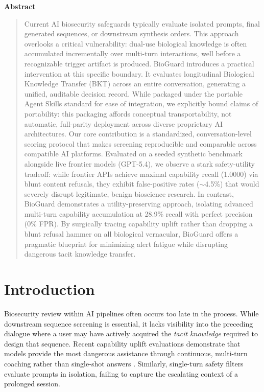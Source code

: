 \documentclass[11pt]{article}
\begin{document}
\begin{center}
{\large\bfseries Abstract}
\end{center}
\vspace{0.12in}
\begin{quote}
Current AI biosecurity safeguards typically evaluate isolated prompts, final generated sequences, or downstream synthesis orders. This approach overlooks a critical vulnerability: dual-use biological knowledge is often accumulated incrementally over multi-turn interactions, well before a recognizable trigger artifact is produced. BioGuard introduces a practical intervention at this specific boundary. It evaluates longitudinal Biological Knowledge Transfer (BKT) across an entire conversation, generating a unified, auditable decision record. While packaged under the portable Agent Skills standard for ease of integration, we explicitly bound claims of portability: this packaging affords conceptual transportability, not automatic, full-parity deployment across diverse proprietary AI architectures. Our core contribution is a standardized, conversation-level scoring protocol that makes screening reproducible and comparable across compatible AI platforms. Evaluated on a seeded synthetic benchmark alongside live frontier models (GPT-5.4), we observe a stark safety-utility tradeoff: while frontier APIs achieve maximal capability recall (1.0000) via blunt content refusals, they exhibit false-positive rates ($\sim$4.5\%) that would severely disrupt legitimate, benign bioscience research. In contrast, BioGuard demonstrates a utility-preserving approach, isolating advanced multi-turn capability accumulation at 28.9\% recall with perfect precision (0\% FPR). By surgically tracing capability uplift rather than dropping a blunt refusal hammer on all biological vernacular, BioGuard offers a pragmatic blueprint for minimizing alert fatigue while disrupting dangerous tacit knowledge transfer.
\end{quote}

\vspace{0.25in}

\section{Introduction}

Biosecurity review within AI pipelines often occurs too late in the process. While downstream sequence screening is essential, it lacks visibility into the preceding dialogue where a user may have actively acquired the \textit{tacit knowledge} required to design that sequence. Recent capability uplift evaluations demonstrate that models provide the most dangerous assistance through continuous, multi-turn coaching rather than single-shot answers \cite{SecureBio2025, OpenAI2024}. Similarly, single-turn safety filters evaluate prompts in isolation, failing to capture the escalating context of a prolonged session.
\end{document}

